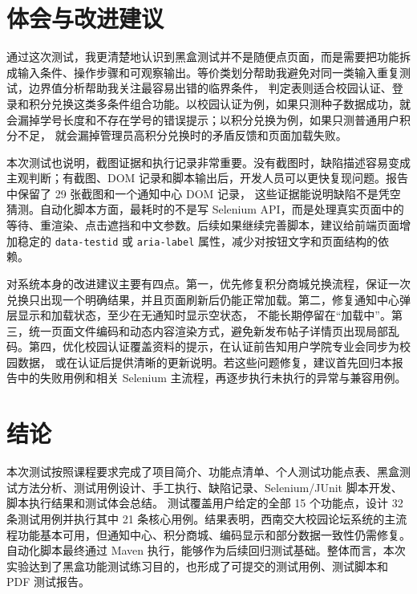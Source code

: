 \documentclass[bwprint]{report}
\begin{document}
\section{体会与改进建议}
通过这次测试，我更清楚地认识到黑盒测试并不是随便点页面，而是需要把功能拆成输入条件、操作步骤和可观察输出。等价类划分帮助我避免对同一类输入重复测试，边界值分析帮助我关注最容易出错的临界条件，
判定表则适合校园认证、登录和积分兑换这类多条件组合功能。以校园认证为例，如果只测种子数据成功，就会漏掉学号长度和不存在学号的错误提示；以积分兑换为例，如果只测普通用户积分不足，
就会漏掉管理员高积分兑换时的矛盾反馈和页面加载失败。

本次测试也说明，截图证据和执行记录非常重要。没有截图时，缺陷描述容易变成主观判断；有截图、DOM 记录和脚本输出后，开发人员可以更快复现问题。报告中保留了 29 张截图和一个通知中心 DOM 记录，
这些证据能说明缺陷不是凭空猜测。自动化脚本方面，最耗时的不是写 Selenium API，而是处理真实页面中的等待、重渲染、点击遮挡和中文参数。后续如果继续完善脚本，建议给前端页面增加稳定的
\texttt{data-testid} 或 \texttt{aria-label} 属性，减少对按钮文字和页面结构的依赖。

对系统本身的改进建议主要有四点。第一，优先修复积分商城兑换流程，保证一次兑换只出现一个明确结果，并且页面刷新后仍能正常加载。第二，修复通知中心弹层显示和加载状态，至少在无通知时显示空状态，
不能长期停留在“加载中”。第三，统一页面文件编码和动态内容渲染方式，避免新发布帖子详情页出现局部乱码。第四，优化校园认证覆盖资料的提示，在认证前告知用户学院专业会同步为校园数据，
或在认证后提供清晰的更新说明。若这些问题修复，建议首先回归本报告中的失败用例和相关 Selenium 主流程，再逐步执行未执行的异常与兼容用例。

\section{结论}
本次测试按照课程要求完成了项目简介、功能点清单、个人测试功能点表、黑盒测试方法分析、测试用例设计、手工执行、缺陷记录、Selenium/JUnit 脚本开发、脚本执行结果和测试体会总结。
测试覆盖用户给定的全部 15 个功能点，设计 32 条测试用例并执行其中 21 条核心用例。结果表明，西南交大校园论坛系统的主流程功能基本可用，但通知中心、积分商城、编码显示和部分数据一致性仍需修复。
自动化脚本最终通过 Maven 执行，能够作为后续回归测试基础。整体而言，本次实验达到了黑盒功能测试练习目的，也形成了可提交的测试用例、测试脚本和 PDF 测试报告。

\appendix
\end{document}

